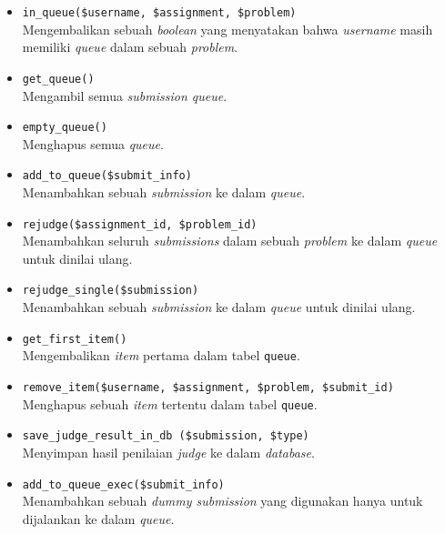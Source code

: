 \begin{itemize}
            \begin{itemize}
                  \item \verb|in_queue($username, $assignment, $problem)| \\
                        Mengembalikan sebuah \textit{boolean} yang menyatakan bahwa \textit{username} masih memiliki \textit{queue} dalam sebuah \textit{problem}.
                  \item \verb|get_queue()| \\
                        Mengambil semua \textit{submission queue}.
                  \item \verb|empty_queue()| \\
                        Menghapus semua \textit{queue}.
                  \item \verb|add_to_queue($submit_info)| \\
                        Menambahkan sebuah \textit{submission} ke dalam \textit{queue}.
                  \item \verb|rejudge($assignment_id, $problem_id)| \\
                        Menambahkan seluruh \textit{submissions} dalam sebuah \textit{problem} ke dalam \textit{queue} untuk dinilai ulang.
                  \item \verb|rejudge_single($submission)| \\
                        Menambahkan sebuah \textit{submission} ke dalam \textit{queue} untuk dinilai ulang.
                  \item \verb|get_first_item()| \\
                        Mengembalikan \textit{item} pertama dalam tabel \verb|queue|.
                  \item \verb|remove_item($username, $assignment, $problem, $submit_id)| \\
                        Menghapus sebuah \textit{item} tertentu dalam tabel \verb|queue|.
                  \item \verb|save_judge_result_in_db ($submission, $type)| \\
                        Menyimpan hasil penilaian \textit{judge} ke dalam \textit{database}.
                  \item \verb|add_to_queue_exec($submit_info)| \\
                        Menambahkan sebuah \textit{dummy submission} yang digunakan hanya untuk dijalankan ke dalam \textit{queue}.
            \end{itemize}


\end{itemize}
